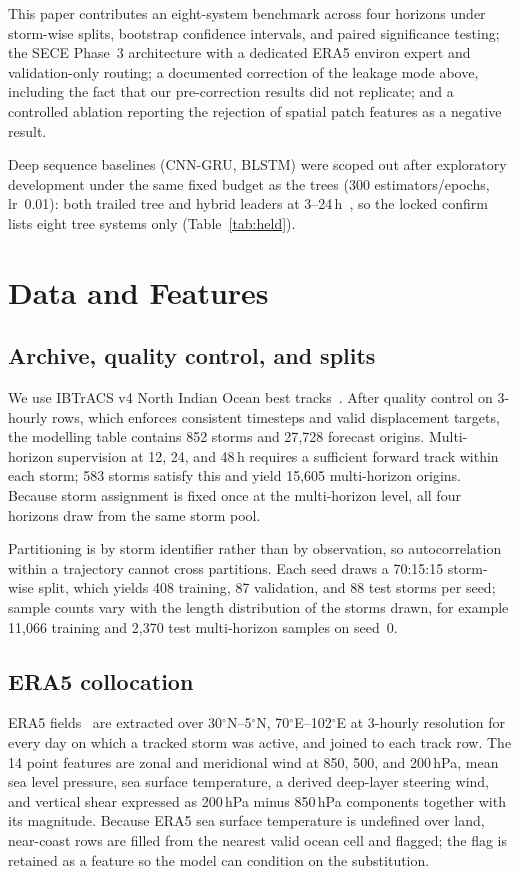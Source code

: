 \documentclass[conference]{IEEEtran}
\newcommand{\sece}{SECE}
\newcommand{\era}{ERA5}
\newcommand{\ibtracs}{IBTrACS}
\begin{document}
This paper contributes an eight-system benchmark across four horizons under
storm-wise splits, bootstrap confidence intervals, and paired significance
testing; the \sece{} Phase~3 architecture with a dedicated \era{} environ expert
and validation-only routing; a documented correction of the leakage mode above,
including the fact that our pre-correction results did not replicate; and a
controlled ablation reporting the rejection of spatial patch features as a
negative result.

Deep sequence baselines (CNN-GRU, BLSTM) were scoped out after exploratory
development under the same fixed budget as the trees (300 estimators/epochs,
lr~0.01): both trailed tree and hybrid leaders at 3--24\,h~\cite{grinsztajn2022tree},
so the locked confirm lists eight tree systems only (Table~\ref{tab:held}).

\section{Data and Features}
\subsection{Archive, quality control, and splits}
We use \ibtracs{} v4 North Indian Ocean best
tracks~\cite{knapp2010ibtracs,gahtan2024ibtracs}. After quality control on
3-hourly rows, which enforces consistent timesteps and valid displacement
targets, the modelling table contains 852 storms and 27{,}728 forecast origins.
Multi-horizon supervision at 12, 24, and 48\,h requires a sufficient forward
track within each storm; 583 storms satisfy this and yield 15{,}605 multi-horizon
origins. Because storm assignment is fixed once at the multi-horizon level, all
four horizons draw from the same storm pool.

Partitioning is by storm identifier rather than by observation, so
autocorrelation within a trajectory cannot cross partitions. Each seed draws a
70:15:15 storm-wise split, which yields 408 training, 87 validation, and 88 test
storms per seed; sample counts vary with the length distribution of the storms
drawn, for example 11{,}066 training and 2{,}370 test multi-horizon samples on
seed~0.

\subsection{ERA5 collocation}
\era{} fields~\cite{hersbach2023era5} are extracted over
30$^\circ$N--5$^\circ$N, 70$^\circ$E--102$^\circ$E at 3-hourly resolution for
every day on which a tracked storm was active, and joined to each track row. The
14 point features are zonal and meridional wind at 850, 500, and 200\,hPa, mean
sea level pressure, sea surface temperature, a derived deep-layer steering wind,
and vertical shear expressed as 200\,hPa minus 850\,hPa components together with
its magnitude. Because \era{} sea surface temperature is undefined over land,
near-coast rows are filled from the nearest valid ocean cell and flagged; the
flag is retained as a feature so the model can condition on the substitution.
\end{document}
